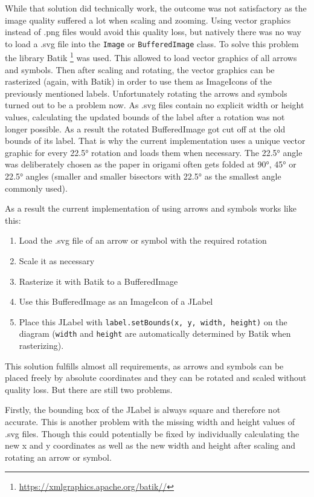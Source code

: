 While that solution did technically work, the outcome was not satisfactory as the image quality suffered a lot when scaling and zooming. Using vector graphics instead of .png files would avoid this quality loss, but natively there was no way to load a .svg file into the \texttt{Image} or \texttt{BufferedImage} class. To solve this problem the library Batik \footnote{\url{https://xmlgraphics.apache.org/batik//}} was used. This allowed to load vector graphics of all arrows and symbols. Then after scaling and rotating, the vector graphics can be rasterized (again, with Batik) in order to use them as ImageIcons of the previously mentioned labels. Unfortunately rotating the arrows and symbols turned out to be a problem now. As .svg files contain no explicit width or height values, calculating the updated bounds of the label after a rotation was not longer possible. As a result the rotated BufferedImage got cut off at the old bounds of its label. That is why the current implementation uses a unique vector graphic for every 22.5° rotation and loads them when necessary. The 22.5° angle was deliberately chosen as the paper in origami often gets folded at 90°, 45° or 22.5° angles (smaller and smaller bisectors with 22.5° as the smallest angle commonly used).%

As a result the current implementation of using arrows and symbols works like this:

\begin{enumerate}[label=\textbf{\arabic*}.]
	\item Load the .svg file of an arrow or symbol with the required rotation
	\item Scale it as necessary
	\item Rasterize it with Batik to a BufferedImage
	\item Use this BufferedImage as an ImageIcon of a JLabel
	\item Place this JLabel with \texttt{label.setBounds(x, y, width, height)}  on the diagram (\texttt{width} and \texttt{height} are automatically determined by Batik when rasterizing).
\end{enumerate}
This solution fulfills almost all requirements, as arrows and symbols can be placed freely by absolute coordinates and they can be rotated and scaled without quality loss. But there are still two problems.

Firstly, the bounding box of the JLabel is always square and therefore not accurate. This is another problem with the missing width and height values of .svg files. Though this could potentially be fixed by individually calculating the new x and y coordinates as well as the new width and height after scaling and rotating an arrow or symbol.

